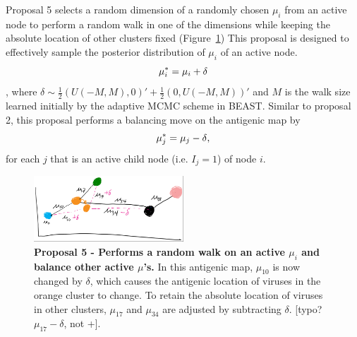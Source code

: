 \documentclass[11pt,oneside,letterpaper]{article}
\begin{document}
Proposal 5 selects a random dimension of a randomly chosen $\mu_i$ from an active node to perform a random walk in one of the dimensions while keeping the absolute location of other clusters fixed (Figure~\ref{walkAndBalance})
This proposal is designed to effectively sample the posterior distribution of $\mu_i$ of an active node. 
\begin{equation}
	\mu_i^{*} =  \mu_i + \delta \\
\end{equation},
where $\delta \sim \frac{1}{2} (U(-M, M), 0)' + \frac{1}{2} (0, U(-M, M))'$ and $M$ is the walk size learned initially by the adaptive MCMC scheme in BEAST.
Similar to proposal 2, this proposal performs a balancing move on the antigenic map by
\begin{equation}
	\mu_j^{*} =  \mu_j - \delta\\     ,
\label{balance_mu}
\end{equation}
for each $j$ that is an active child node (i.e. $I_j = 1$) of node $i$.



\begin{figure}[h]
	\centering		
	\includegraphics[width=0.5\textwidth]{figures/walkAndBalance}
	\caption{\textbf{Proposal 5 - Performs a random walk on an active $\mu_i$ and balance other active $\mu$'s.} 
In this antigenic map, $\mu_{10}$ is now changed by $\delta$, which causes the antigenic location of viruses in the orange cluster to change. 
To retain the absolute location of viruses in other clusters,  $\mu_{17}$ and $\mu_{34}$ are adjusted by subtracting $\delta$. [typo?  $\mu_{17} - \delta$, not +].
	} 
	\label{walkAndBalance} 
\end{figure}
\end{document}
